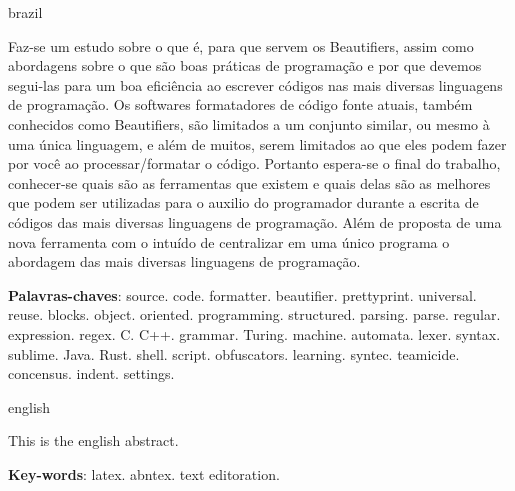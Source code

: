 %
\begin{otherlanguage*}{brazil}
\begin{resumo}

    Faz-se um estudo sobre o que é, para que servem os Beautifiers, assim como abordagens sobre o
    que são boas práticas de programação e por que devemos segui-las para um boa eficiência ao
    escrever códigos nas mais diversas linguagens de programação. Os softwares formatadores de
    código fonte atuais, também conhecidos como Beautifiers, são limitados a um conjunto similar, ou
    mesmo à uma única linguagem, e além de muitos, serem limitados ao que eles podem fazer por você
    ao processar/formatar o código.
    Portanto espera-se o final do trabalho, conhecer-se quais são as ferramentas que existem e quais
    delas são as melhores que podem ser utilizadas para o auxilio do programador durante a escrita
    de códigos das mais diversas linguagens de programação. Além de proposta de uma nova ferramenta
    com o intuído de centralizar em uma único programa o abordagem das mais diversas linguagens de
    programação.

\vspace{\onelineskip}
\textbf{Palavras-chaves}:
    source. code. formatter. beautifier. prettyprint. universal. reuse. blocks. object. oriented.
    programming. structured. parsing. parse. regular. expression. regex. C. C++.  grammar. Turing.
    machine. automata. lexer. syntax. sublime. Java. Rust. shell. script. obfuscators. learning.
    syntec. teamicide. concensus. indent. settings.

\end{resumo}
\end{otherlanguage*}


\begin{otherlanguage*}{english}
\begin{resumo}[Abstract]

    This is the english abstract.

    \vspace{\onelineskip}
    \noindent\textbf{Key-words}: latex. abntex. text editoration.

\end{resumo}
\end{otherlanguage*}


